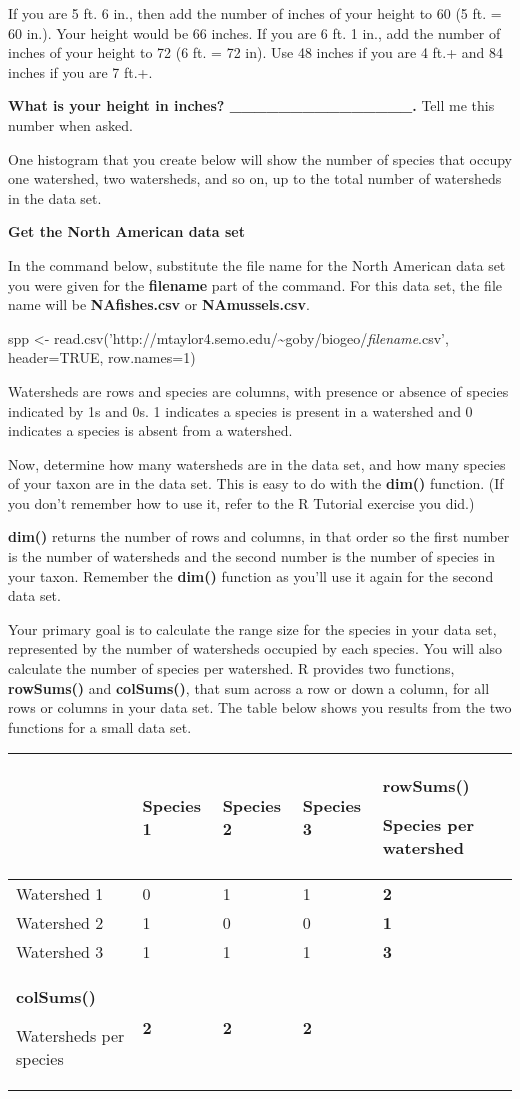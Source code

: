 If you are 5 ft. 6 in., then add the number of inches of your height to
60 (5 ft. = 60 in.). Your height would be 66 inches. If you are 6 ft. 1
in., add the number of inches of your height to 72 (6 ft. = 72 in). Use
48 inches if you are 4 ft.+ and 84 inches if you are 7 ft.+.

\textbf{What is your height in inches? \_\_\_\_\_\_\_\_\_\_\_\_\_\_\_.}
Tell me this number when asked.

One histogram that you create below will show the number of species that
occupy one watershed, two watersheds, and so on, up to the total number
of watersheds in the data set.

\textbf{Get the North American data set}

In the command below, substitute the file name for the North American
data set you were given for the \textbf{filename} part of the command.
For this data set, the file name will be \textbf{NAfishes.csv} or
\textbf{NAmussels.csv}.

spp \textless{}-
read.csv('http://mtaylor4.semo.edu/\textasciitilde{}goby/biogeo/\emph{filename}.csv',
header=TRUE, row.names=1)

Watersheds are rows and species are columns, with presence or absence of
species indicated by 1s and 0s. 1 indicates a species is present in a
watershed and 0 indicates a species is absent from a watershed.

Now, determine how many watersheds are in the data set, and how many
species of your taxon are in the data set. This is easy to do with the
\textbf{dim()} function. (If you don't remember how to use it, refer to
the R Tutorial exercise you did.)

\textbf{dim()} returns the number of rows and columns, in that order so
the first number is the number of watersheds and the second number is
the number of species in your taxon. Remember the \textbf{dim()}
function as you'll use it again for the second data set.

Your primary goal is to calculate the range size for the species in your
data set, represented by the number of watersheds occupied by each
species. You will also calculate the number of species per watershed. R
provides two functions, \textbf{rowSums()} and \textbf{colSums()}, that
sum across a row or down a column, for all rows or columns in your data
set. The table below shows you results from the two functions for a
small data set.

\begin{longtable}[c]{@{}lllll@{}}
\toprule
& Species 1 & Species 2 & Species 3 & \textbf{rowSums()}

Species per watershed\tabularnewline
\midrule
\endhead
Watershed 1 & 0 & 1 & 1 & \textbf{2}\tabularnewline
Watershed 2 & 1 & 0 & 0 & \textbf{1}\tabularnewline
Watershed 3 & 1 & 1 & 1 & \textbf{3}\tabularnewline
\textbf{colSums()}

Watersheds per species & \textbf{2} & \textbf{2} & \textbf{2}
&\tabularnewline
\bottomrule
\end{longtable}

